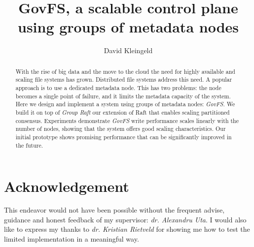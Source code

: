 \documentclass[lang=en, hanging-titles=true]{skrapport}
\title{GovFS, a scalable control plane using groups of metadata nodes}
\author[opensource@davidsk.dev]{David Kleingeld}
\begin{document}
\begin{titlepage}
\maketitle

\begin{abstract}
With the rise of big data and the move to the cloud the need for highly available and scaling file systems has grown. Distributed file systems address this need. A popular approach is to use a dedicated metadata node. This has two problems: the node becomes a single point of failure, and it limits the metadata capacity of the system. Here we design and implement a system using groups of metadata nodes: \textit{GovFS}. We build it on top of \textit{Group Raft} our extension of Raft that enables scaling partitioned consensus. Experiments demonstrate \textit{GovFS} write performance scales linearly with the number of nodes, showing that the system offers good scaling characteristics. Our initial prototype shows promising performance that can be significantly improved in the future.
\end{abstract}
\end{titlepage}

\section*{Acknowledgement}
This endeavor would not have been possible without the frequent advise, guidance and honest feedback of my supervisor: \emph{dr. Alexandru Uta}. 
I would also like to express my thanks to \emph{dr. Kristian Rietveld} for showing me how to test the limited implementation in a meaningful way.

\tableofcontents
\restoregeometry
\clearpage

\newcommand{\zookeeper}{ZooKeeper}
\newcommand{\raft}{Raft}
\newcommand{\paxos}{Paxos}
\newcommand{\multipaxos}{Multi-Paxos}
\newcommand{\ceph}{Ceph}
\newcommand{\zab}{Zab}
\end{document}
